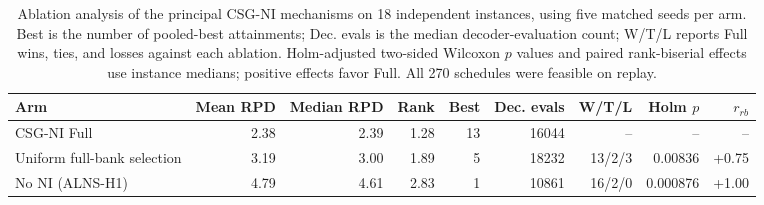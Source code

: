\begin{table}[t]
\centering
\caption{Ablation analysis of the principal CSG-NI mechanisms on 18 independent instances, using five matched seeds per arm. Best is the number of pooled-best attainments; Dec. evals is the median decoder-evaluation count; W/T/L reports Full wins, ties, and losses against each ablation. Holm-adjusted two-sided Wilcoxon $p$ values and paired rank-biserial effects use instance medians; positive effects favor Full. All 270 schedules were feasible on replay.}
\label{tab:p1_ablation}
\footnotesize
\begin{tabular}{lrrrrrrrr}
\toprule
Arm & Mean RPD & Median RPD & Rank & Best & Dec. evals & W/T/L & Holm $p$ & $r_{rb}$ \\
\midrule
CSG-NI Full & 2.38 & 2.39 & 1.28 & 13 & 16044 & -- & -- & -- \\
Uniform full-bank selection & 3.19 & 3.00 & 1.89 & 5 & 18232 & 13/2/3 & 0.00836 & +0.75 \\
No NI (ALNS-H1) & 4.79 & 4.61 & 2.83 & 1 & 10861 & 16/2/0 & 0.000876 & +1.00 \\
\bottomrule
\end{tabular}
\end{table}
